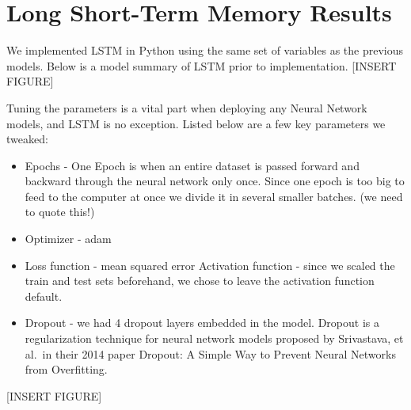 \documentclass[12pt,oneside]{chicagocapstone}
\providecommand{\tightlist}{%
  \setlength{\itemsep}{0pt}\setlength{\parskip}{0pt}}
\begin{document}
\hypertarget{long-short-term-memory-results}{%
\section*{Long Short-Term Memory Results}\label{long-short-term-memory-results}}

We implemented LSTM in Python using the same set of variables as the previous models. Below is a model summary of LSTM prior to implementation.
{[}INSERT FIGURE{]}

Tuning the parameters is a vital part when deploying any Neural Network models, and LSTM is no exception. Listed below are a few key parameters we tweaked:
\begin{itemize}
\tightlist
\item
  Epochs - One Epoch is when an entire dataset is passed forward and backward through the neural network only once. Since one epoch is too big to feed to the computer at once we divide it in several smaller batches. (we need to quote this!)
\item
  Optimizer - adam
\item
  Loss function - mean squared error
  Activation function - since we scaled the train and test sets beforehand, we chose to leave the activation function default.
\item
  Dropout - we had 4 dropout layers embedded in the model. Dropout is a regularization technique for neural network models proposed by Srivastava, et al.~in their 2014 paper Dropout: A Simple Way to Prevent Neural Networks from Overfitting.
\end{itemize}
{[}INSERT FIGURE{]}
\end{document}
